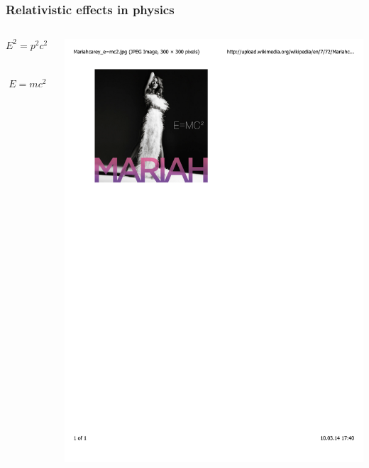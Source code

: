 \documentclass[mathserif,10pt]{beamer}
\begin{document}
\begin{frame}
    \frametitle{Relativistic effects in physics}
    \begin{columns}
    \begin{column}{.50\textwidth}
	\begin{equation}
	    \nonumber
	    E^2 = p^2c^2 + m^2c^4
	\end{equation}
	\ \\
	\ \\
	\begin{equation}
	    \nonumber
	    E = mc^2
	\end{equation}
    \end{column}
    \begin{column}{.50\textwidth}
	\centering
	\includegraphics[viewport = 60 560 285 800, clip, scale=0.4]{figures/mariah.pdf}
    \end{column}
    \end{columns}
\end{frame}
\end{document}
